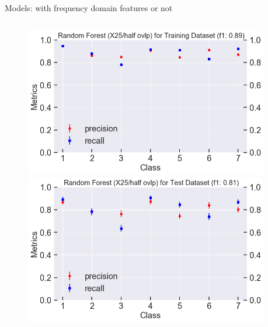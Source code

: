 \documentclass{if-beamer}
\begin{document}
\begin{frame}{Models: with frequency domain features or not} 
    
    \begin{columns}
   \begin{column}{0.5\textwidth} 

            \begin{figure}
            \includegraphics[scale=0.2]{./figs/rf_X25_half_train_score.png}
            \includegraphics[scale=0.2]{./figs/rf_X25_half_test_score.png}
            \end{figure}
   \end{column} 
    
\begin{column}{0.5\textwidth}


\end{column}
\end{columns}
\end{frame}
\end{document}
